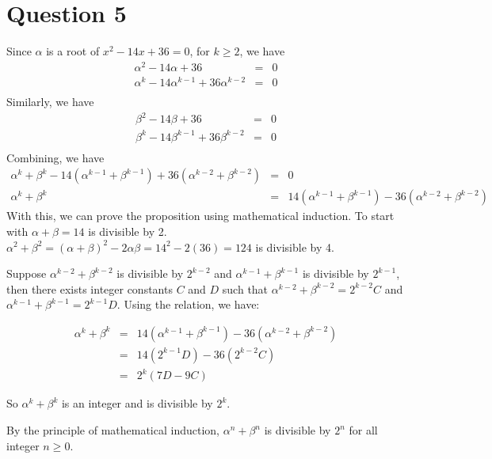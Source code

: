 \section*{Question 5}
Since $ \alpha $ is a root of $ x^2 - 14 x + 36 = 0 $, for $ k \ge 2 $, we have
\begin{eqnarray*}
  \alpha^2 - 14\alpha + 36 &=& 0 \\
  \alpha^k - 14\alpha^{k-1} + 36\alpha^{k-2} &=& 0 \\
\end{eqnarray*}
Similarly, we have
\begin{eqnarray*}
  \beta^2 - 14\beta + 36 &=& 0 \\
  \beta^k - 14\beta^{k-1} + 36\beta^{k-2} &=& 0 \\
\end{eqnarray*}
Combining, we have
\begin{eqnarray*}
  \alpha^k + \beta^k - 14(\alpha^{k-1} + \beta^{k-1}) + 36(\alpha^{k-2} + \beta^{k-2}) &=& 0 \\
  \alpha^k + \beta^k &=& 14(\alpha^{k-1} + \beta^{k-1}) - 36(\alpha^{k-2} + \beta^{k-2}) 
\end{eqnarray*}
With this, we can prove the proposition using mathematical induction. To start with
$ \alpha + \beta = 14 $ is divisible by 2. $ \alpha^2 + \beta^2 = (\alpha + \beta)^2 - 2\alpha\beta = 14^2 - 2(36) = 124 $ is divisible by 4.

Suppose $ \alpha^{k-2} + \beta^{k-2} $ is divisible by $ 2^{k-2} $ and $ \alpha^{k-1} + \beta^{k-1} $ is divisible by $ 2^{k-1} $, then there exists integer constants $ C $ and $ D $ such that $  \alpha^{k-2} + \beta^{k-2} = 2^{k-2} C $ and $  \alpha^{k-1} + \beta^{k-1} = 2^{k-1} D $. Using the relation, we have:

\begin{eqnarray*}
  \alpha^k + \beta^k &=& 14(\alpha^{k-1} + \beta^{k-1}) - 36(\alpha^{k-2} + \beta^{k-2}) \\
                     &=& 14(2^{k-1} D) - 36(2^{k-2} C) \\
                     &=& 2^k(7D - 9C) 
\end{eqnarray*}

So $ \alpha^k + \beta^k $ is an integer and is divisible by $ 2^k $.

By the principle of mathematical induction, $ \alpha^n + \beta^n $ is divisible by $ 2^n $ for all integer $ n \ge 0 $.
